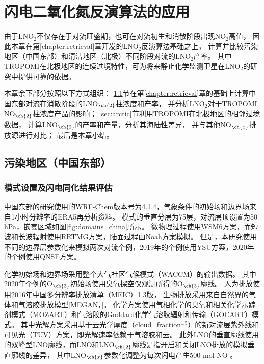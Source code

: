 
\chapter{闪电二氧化氮反演算法的应用} \label{chapter:PE}

由于LNO$_2$不仅存在于对流旺盛期，也可在对流初生和消散阶段出现NO$_2$高值，
因此本章在第\ref{chapter:retrieval}章开发的LNO$_2$反演算法基础之上，
计算并比较污染地区（中国东部）和清洁地区（北极）不同阶段对流的LNO$_2$产率。
其中TROPOMI在北极地区的连续过境特性，可为将来静止化学监测卫星在LNO$_2$的研究中提供可靠的依据。

本章余下部分按照以下方式组织：
\ref{sec:china}节在第\ref{chapter:retrieval}章的基础上计算中国东部对流在消散阶段的LNO$_{\ch{2}}$柱浓度和产率，
并分析LNO$_2$对于TROPOMI NO$_{\ch{2}}$柱浓度产品的影响；
\ref{sec:arctic}节利用TROPOMI在北极地区的相邻过境数据，
计算LNO$_{\ch{2}}$的产率和产量，分析其海陆性差异，
并与其他NO$_{\ch{x}}$排放源进行对比；
最后是本章小结。


\section{污染地区（中国东部）} \label{sec:china}

\subsection{模式设置及闪电同化结果评估} \label{sec:model_settings_china}

中国东部的研究使用的WRF-Chem版本号为4.1.4，气象条件的初始场和边界场来自1小时分辨率的ERA5再分析资料。
模式的垂直分层为75层，对流层顶设置为50 hPa，嵌套区域如图\ref{fig:domains_china}所示。
微物理过程使用WSM6方案\citep{Hong.2006a}，而短波和长波辐射使用RRTMG方案\citep{Iacono.2008}，陆面过程由Noah方案模拟\citep{Koren.1999}。
但是，本研究使用不同的边界层参数化来模拟两次对流个例，2019年的个例使用YSU方案\citep{Hong.2006}，2020年的个例使用QNSE方案\citep{Sukoriansky.2005}。

化学初始场和边界场采用整个大气社区气候模式（WACCM）的输出数据。
其中2020年个例的O$_{\ch{3}}$初始场使用臭氧探空仪观测所得的O$_{\ch{3}}$廓线。
人为排放使用2016年中国多分辨率排放清单（MEIC）1.3版，
生物排放采用来自自然界的气体和气溶胶排放模型[MEGAN，\citet{Guenther.2006}]。
化学方案使用气相化学的臭氧和相关化学示踪剂模式（MOZART）和气溶胶的Goddard化学气溶胶辐射和传输（GOCART）模式\citep{Pfister.2011}。
其中光解方案采用基于云光学厚度（cloud\_fraction$^{1.5}$）的新对流层紫外线和可见光（TUV）方案，即光解速率依赖于气溶胶和云。
此外LNO的垂直廓线使用\citet{Ott.2010}的双峰型LNO廓线\citep{Laughner.2017}，而LNO和LNO$_{\ch{2}}$廓线是指开启和关闭LNO排放的模拟垂直廓线的差异，
其中LNO$_{\ch{x}}$参数化调整为每次闪电产生500 mol NO \citep{Zhu.2019}。


